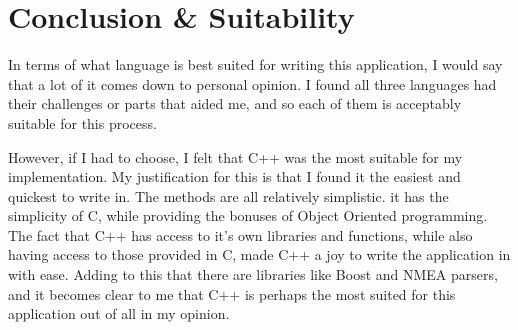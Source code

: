 \documentclass{article}
\begin{document}



\section{Conclusion \& Suitability}
In terms of what language is best suited for writing this application, I would say that a lot of it comes down to personal opinion. I found all three languages had their challenges or parts that aided me, and so each of them is acceptably suitable for this process. 

However, if I had to choose, I felt that C++  was the most suitable for my implementation. My justification for this is that I found it the easiest and quickest to write in. The methods are all relatively simplistic. it has the simplicity of C, while providing the bonuses of Object Oriented programming. The fact that C++ has access to it's own libraries and functions, while also having access to those provided in C, made C++ a joy to write the application in with ease. Adding to this that there are libraries like Boost and NMEA parsers, and it becomes clear to me that C++ is perhaps the most suited for this application out of all in my opinion.

\clearpage

\end{document}
